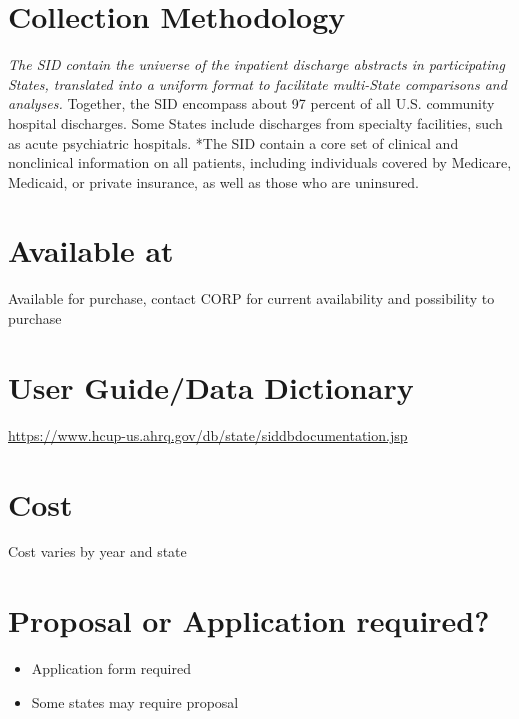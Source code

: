 \documentclass[
]{book}
\providecommand{\tightlist}{%
  \setlength{\itemsep}{0pt}\setlength{\parskip}{0pt}}
\begin{document}
\hypertarget{collection-methodology-85}{%
\section{Collection Methodology}\label{collection-methodology-85}}

\emph{The SID contain the universe of the inpatient discharge abstracts in participating States, translated into a uniform format to facilitate multi-State comparisons and analyses.
}Together, the SID encompass about 97 percent of all U.S. community hospital discharges. Some States include discharges from specialty facilities, such as acute psychiatric hospitals.
*The SID contain a core set of clinical and nonclinical information on all patients, including individuals covered by Medicare, Medicaid, or private insurance, as well as those who are uninsured.

\hypertarget{available-at-85}{%
\section{Available at}\label{available-at-85}}

Available for purchase, contact CORP for current availability and possibility to purchase

\hypertarget{user-guidedata-dictionary-85}{%
\section{User Guide/Data Dictionary}\label{user-guidedata-dictionary-85}}

\url{https://www.hcup-us.ahrq.gov/db/state/siddbdocumentation.jsp}

\hypertarget{cost-85}{%
\section{Cost}\label{cost-85}}

Cost varies by year and state

\hypertarget{proposal-or-application-required-85}{%
\section{Proposal or Application required?}\label{proposal-or-application-required-85}}

\begin{itemize}
\tightlist
\item
  Application form required
\item
  Some states may require proposal
\end{itemize}
\end{document}
